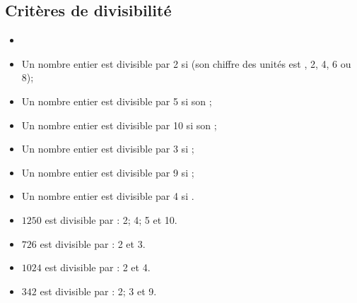 \subsection{Critères de divisibilité}

\begin{myprops}
	
	\begin{itemize}
		\item \item Un nombre entier est divisible par 2 si  (son chiffre des unités est , 2, 4, 6 ou 8);
		\item Un nombre entier est divisible par 5 si son ;
		\item Un nombre entier est divisible par 10 si son ;	
	
		\item Un nombre entier est divisible par 3 si ;
		\item Un nombre entier est divisible par 9 si ;
		
		\item Un nombre entier est divisible par 4 si .
	\end{itemize}
\end{myprops}

\begin{myexs}
	\begin{itemize}
		\item $1250$ est divisible par : 2; 4; 5 et 10. 
		\item $726$ est divisible par : 2 et 3.
		\item $1024$ est divisible par : 2 et 4.
		\item $342$ est divisible par : 2; 3 et 9.
		
	\end{itemize}
\end{myexs}


